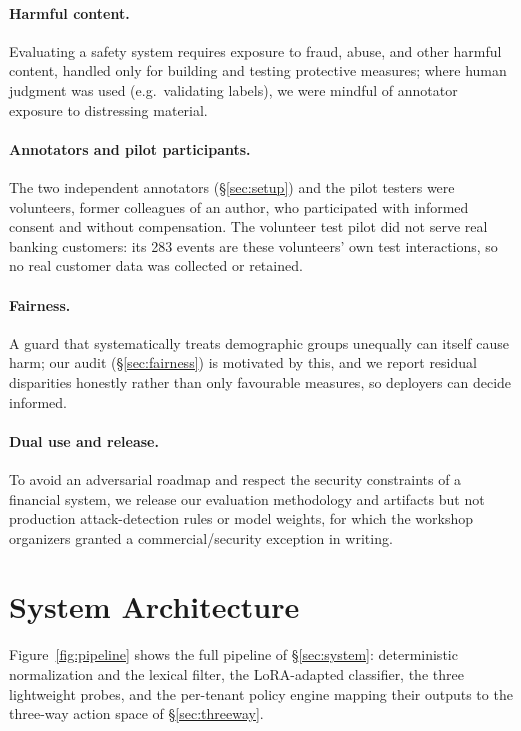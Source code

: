 \documentclass[11pt]{article}
\begin{document}
\paragraph{Harmful content.} Evaluating a safety system requires exposure to fraud, abuse, and other harmful content, handled only for building and testing protective measures; where human judgment was used (e.g.\ validating labels), we were mindful of annotator exposure to distressing material.

\paragraph{Annotators and pilot participants.} The two independent annotators (\S\ref{sec:setup}) and the pilot testers were volunteers, former colleagues of an author, who participated with informed consent and without compensation. The volunteer test pilot did not serve real banking customers: its 283 events are these volunteers' own test interactions, so no real customer data was collected or retained.

\paragraph{Fairness.} A guard that systematically treats demographic groups unequally can itself cause harm; our audit (\S\ref{sec:fairness}) is motivated by this, and we report residual disparities honestly rather than only favourable measures, so deployers can decide informed.

\paragraph{Dual use and release.} To avoid an adversarial roadmap and respect the security constraints of a financial system, we release our evaluation methodology and artifacts but not production attack-detection rules or model weights, for which the workshop organizers granted a commercial/security exception in writing.



\appendix

\section{System Architecture}
\label{app:arch}

Figure~\ref{fig:pipeline} shows the full pipeline of \S\ref{sec:system}: deterministic normalization and the lexical filter, the LoRA-adapted classifier, the three lightweight probes, and the per-tenant policy engine mapping their outputs to the three-way action space of \S\ref{sec:threeway}.
\end{document}
